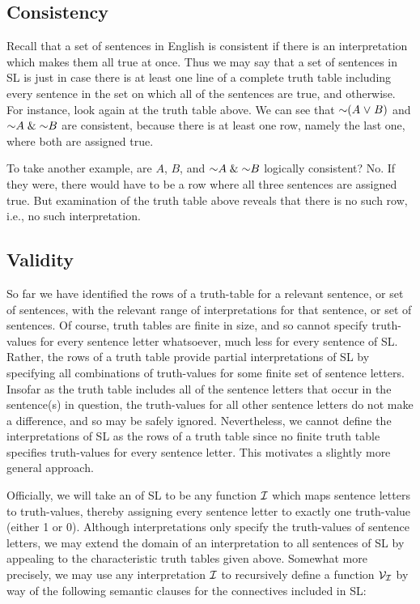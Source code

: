 \subsection{Consistency}

Recall that a set of sentences in English is consistent if there is an interpretation which makes them all true at once.
Thus we may say that a set of sentences in SL is  just in case there is at least one line of a complete truth table including every sentence in the set on which all of the sentences are true, and  otherwise.
For instance, look again at the truth table above.
We can see that $\enot(A \eor B)$ and $\enot A \eand \enot B$ are consistent, because there is at least one row, namely the last one, where both are assigned true.

To take another example, are $A$, $B$, and $\enot A \eand \enot B$ logically consistent?
No.
If they were, there would have to be a row where all three sentences are assigned true.
But examination of the truth table above reveals that there is no such row, i.e., no such interpretation.





\subsection{Validity}
\label{sub:validity}

So far we have identified the rows of a truth-table for a relevant sentence, or set of sentences, with the relevant range of interpretations for that sentence, or set of sentences.
Of course, truth tables are finite in size, and so cannot specify truth-values for every sentence letter whatsoever, much less for every sentence of SL.
Rather, the rows of a truth table provide partial interpretations of SL by specifying all combinations of truth-values for some finite set of sentence letters.
Insofar as the truth table includes all of the sentence letters that occur in the sentence(s) in question, the truth-values for all other sentence letters do not make a difference, and so may be safely ignored.
Nevertheless, we cannot define the interpretations of SL as the rows of a truth table since no finite truth table specifies truth-values for every sentence letter.
This motivates a slightly more general approach.

Officially, we will take an  of SL to be any function $\mathcal{I}$ which maps sentence letters to truth-values, thereby assigning every sentence letter to exactly one truth-value (either 1 or 0).
Although interpretations only specify the truth-values of sentence letters, we may extend the domain of an interpretation to all sentences of SL by appealing to the characteristic truth tables given above.
Somewhat more precisely, we may use any interpretation $\mathcal{I}$ to recursively define a  function $\mathcal{V}_{\mathcal{I}}$ by way of the following semantic clauses for the connectives included in SL:

